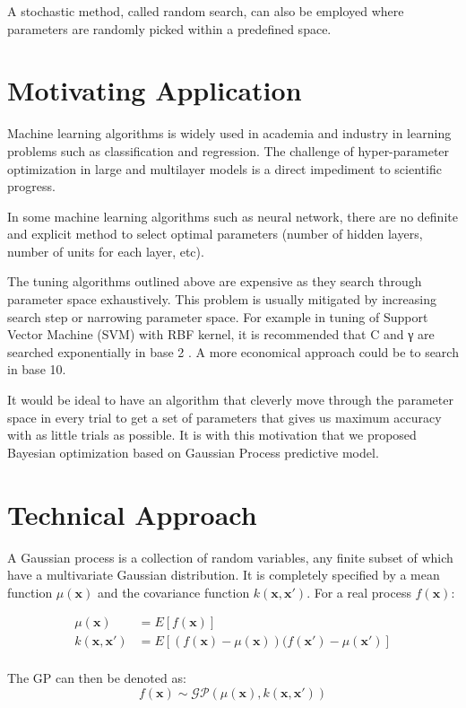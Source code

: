 \documentclass[letterpaper]{article}
\begin{document}
A stochastic method, called random search, can also be employed where parameters are randomly picked within a predefined space.


\section{Motivating Application}
Machine learning algorithms is widely used in academia and industry in learning problems such as classification and regression. The challenge of hyper-parameter optimization in large and multilayer models is a direct impediment to scientific progress.


In some machine learning algorithms such as neural network, there are no definite and explicit method to select optimal parameters (number of hidden layers, number of units for each layer, etc).


The tuning algorithms outlined above are expensive as they search through parameter space exhaustively. This problem is usually mitigated by increasing search step or narrowing parameter space. For example in tuning of Support Vector Machine (SVM) with RBF kernel, it is recommended that C and γ are searched exponentially in base 2 . A more economical approach could be to search in base 10.


It would be ideal to have an algorithm that cleverly move through the parameter space in every trial to get a set of parameters that gives us maximum accuracy with as little trials as possible. It is with this motivation that we proposed Bayesian optimization based on Gaussian Process predictive model.

\section{Technical Approach}
A Gaussian process is a collection of random variables, any finite subset of which have a multivariate Gaussian distribution. It is completely specified by a mean function $\mu(\textbf{x})$ and the covariance function $k(\textbf{x}, \textbf{x}')$. For a real process $f(\textbf{x})$:

\begin{align*}
	\mu(\textbf{x}) &= E[f(\textbf{x})] \\
	k(\textbf{x}, \textbf{x}') &= E[(f(\textbf{x}) - \mu(\textbf{x}))(f(\textbf{x}') - \mu(\textbf{x}')] \\
\end{align*}

The GP can then be denoted as:
\[f(\textbf{x}) \sim \mathcal{GP}(\mu(\textbf{x}), k(\textbf{x}, \textbf{x}'))\]
\end{document}
